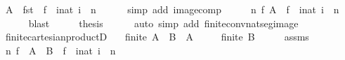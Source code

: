 \begin{isabellebody}
\ {\isachardoublequoteopen}A\ {\isacharequal}{\kern0pt}\ {\isacharparenleft}{\kern0pt}fst\ {\isasymcirc}\ f{\isacharparenright}{\kern0pt}\ {\isacharbackquote}{\kern0pt}\ {\isacharbraceleft}{\kern0pt}i{\isacharcolon}{\kern0pt}{\isacharcolon}{\kern0pt}nat{\isachardot}{\kern0pt}\ i\ {\isacharless}{\kern0pt}\ n{\isacharbraceright}{\kern0pt}{\isachardoublequoteclose}\isanewline
\ \ \ \ \isamarkupfalse%
\ {\isacharparenleft}{\kern0pt}simp\ add{\isacharcolon}{\kern0pt}\ image{\isacharunderscore}{\kern0pt}comp{\isacharparenright}{\kern0pt}\isanewline
\ \ \isamarkupfalse%
\ \isamarkupfalse%
\ {\isachardoublequoteopen}{\isasymexists}n\ f{\isachardot}{\kern0pt}\ A\ {\isacharequal}{\kern0pt}\ f\ {\isacharbackquote}{\kern0pt}\ {\isacharbraceleft}{\kern0pt}i{\isacharcolon}{\kern0pt}{\isacharcolon}{\kern0pt}nat{\isachardot}{\kern0pt}\ i\ {\isacharless}{\kern0pt}\ n{\isacharbraceright}{\kern0pt}{\isachardoublequoteclose}\isanewline
\ \ \ \ \isamarkupfalse%
\ blast\isanewline
\ \ \isamarkupfalse%
\ \isamarkupfalse%
\ {\isacharquery}{\kern0pt}thesis\isanewline
\ \ \ \ \isamarkupfalse%
\ {\isacharparenleft}{\kern0pt}auto\ simp\ add{\isacharcolon}{\kern0pt}\ finite{\isacharunderscore}{\kern0pt}conv{\isacharunderscore}{\kern0pt}nat{\isacharunderscore}{\kern0pt}seg{\isacharunderscore}{\kern0pt}image{\isacharparenright}{\kern0pt}\isanewline
{}\isamarkupfalse%
%
\endisatagproof
{\isafoldproof}%
%
\isadelimproof
\isanewline
%
\endisadelimproof
\isanewline
{}\isamarkupfalse%
\ finite{\isacharunderscore}{\kern0pt}cartesian{\isacharunderscore}{\kern0pt}productD{}{\isacharcolon}{\kern0pt}\isanewline
\ \ \ {\isachardoublequoteopen}finite\ {\isacharparenleft}{\kern0pt}A\ {\isasymtimes}\ B{\isacharparenright}{\kern0pt}{\isachardoublequoteclose}\ \ {\isachardoublequoteopen}A\ {\isasymnoteq}\ {\isacharbraceleft}{\kern0pt}{\isacharbraceright}{\kern0pt}{\isachardoublequoteclose}\isanewline
\ \ \ {\isachardoublequoteopen}finite\ B{\isachardoublequoteclose}\isanewline
%
\isadelimproof
%
\endisadelimproof
%
\isatagproof
{}\isamarkupfalse%
\ {\isacharminus}{\kern0pt}\isanewline
\ \ \isamarkupfalse%
\ assms\ \isamarkupfalse%
\ n\ f\ \ {\isachardoublequoteopen}A\ {\isasymtimes}\ B\ {\isacharequal}{\kern0pt}\ f\ {\isacharbackquote}{\kern0pt}\ {\isacharbraceleft}{\kern0pt}i{\isacharcolon}{\kern0pt}{\isacharcolon}{\kern0pt}nat{\isachardot}{\kern0pt}\ i\ {\isacharless}{\kern0pt}\ n{\isacharbraceright}{\kern0pt}{\isachardoublequoteclose}\isanewline

\end{isabellebody}

